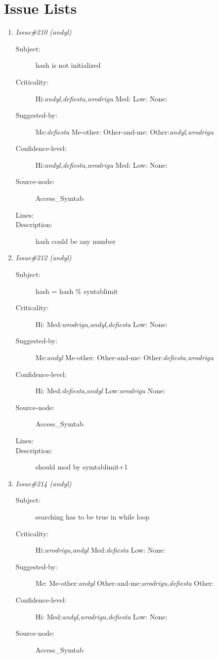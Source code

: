 \section{Issue Lists}
\begin{enumerate}
\item {\it Issue\#210 (andyl)}
\begin{description}
\item [Subject:] hash is not initialized
\item [Criticality:] Hi:{\it andyl,defiesta,wrodrigu} Med:{\it } Low:{\it } None:{\it }
\item [Suggested-by:] Me:{\it defiesta} Me-other:{\it } Other-and-me:{\it } Other:{\it andyl,wrodrigu}
\item [Confidence-level:] Hi:{\it andyl,defiesta,wrodrigu} Med:{\it } Low:{\it } None:{\it }
\item [Source-node:] Access\_Symtab

\item [Lines:] 

\item [Description:] hash could be any number
\end{description}
\item {\it Issue\#212 (andyl)}
\begin{description}
\item [Subject:] hash = hash \% syntablimit
\item [Criticality:] Hi:{\it } Med:{\it wrodrigu,andyl,defiesta} Low:{\it } None:{\it }
\item [Suggested-by:] Me:{\it andyl} Me-other:{\it } Other-and-me:{\it } Other:{\it defiesta,wrodrigu}
\item [Confidence-level:] Hi:{\it } Med:{\it defiesta,andyl} Low:{\it wrodrigu} None:{\it }
\item [Source-node:] Access\_Symtab

\item [Lines:] 

\item [Description:] should mod by symtablimit+1
\end{description}
\item {\it Issue\#214 (andyl)}
\begin{description}
\item [Subject:] searching has to be true  in while loop
\item [Criticality:] Hi:{\it wrodrigu,andyl} Med:{\it defiesta} Low:{\it } None:{\it }
\item [Suggested-by:] Me:{\it } Me-other:{\it andyl} Other-and-me:{\it wrodrigu,defiesta} Other:{\it }
\item [Confidence-level:] Hi:{\it } Med:{\it andyl,wrodrigu,defiesta} Low:{\it } None:{\it }
\item [Source-node:] Access\_Symtab


\end{description}
\end{enumerate}
